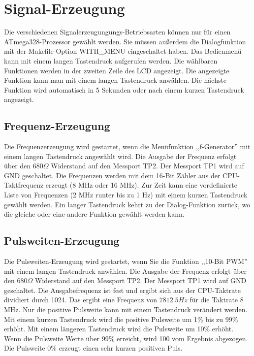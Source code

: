 \chapter{Signal-Erzeugung}

Die verschiedenen Signalerzeugungungs-Betriebsarten können nur für einen ATmega328-Prozessor
gewählt werden.
Sie müssen außerdem die Dialogfunktion mit der Makefile-Option WITH\_MENU eingeschaltet haben.
Das Bedienmenü kann mit einem langen Tastendruck aufgerufen werden.
Die wählbaren Funktionen werden in der zweiten Zeile des LCD angezeigt.
Die angezeigte Funktion kann man mit einem langen Tastendruck anwählen.
Die nächste Funktion wird automatisch in 5 Sekunden oder nach einem kurzen Tastendruck
angezeigt.

\label{sec:generation}

\section{Frequenz-Erzeugung}
Die Frequenzerzeugung wird gestartet, wenn die Menüfunktion ,,f-Generator'' mit einem
langen Tastendruck angewählt wird.
Die Ausgabe der Frequenz erfolgt über den \(680\Omega\) Widerstand auf den Messport TP2.
Der Messport TP1 wird auf GND geschaltet.
Die Frequenzen werden mit dem 16-Bit Zähler aus der CPU-Taktfrequenz erzeugt (8 MHz oder 16 MHz).
Zur Zeit kann eine vordefinierte Liste von Frequenzen (2 MHz runter bis zu 1 Hz) mit einem kurzen
Tastendruck gewählt werden. Ein langer Tastendruck kehrt zu der Dialog-Funktion zurück,
wo die gleiche oder eine andere Funktion gewählt werden kann.

\section{Pulsweiten-Erzeugung}
Die Pulsweiten-Erzeugung wird gestartet, wenn Sie die Funktion ,,10-Bit PWM'' mit einem
langen Tastendruck anwählen.
Die Ausgabe der Frequenz erfolgt über den \(680\Omega\) Widerstand auf den Messport TP2.
Der Messport TP1 wird auf GND geschaltet.
Die Ausgabefrequenz ist fest und ergibt sich aus der CPU-Taktrate dividiert durch 1024.
Das ergibt eine Frequenz von \(7812.5 Hz\) für die Taktrate 8 MHz.
Nur die positive Pulsweite kann mit einem Tastendruck verändert werden. Mit einem
kurzen Tastendruck wird die positive Pulsweite um 1\% bis zu 99\% erhöht.
Mit einem längeren Tastendruck wird die Pulsweite um 10\% erhöht.
Wenn die Pulsweite Werte über 99\% erreicht, wird 100 vom Ergebnis abgezogen.
Die Pulsweite 0\% erzeugt einen sehr kurzen positiven Puls.


